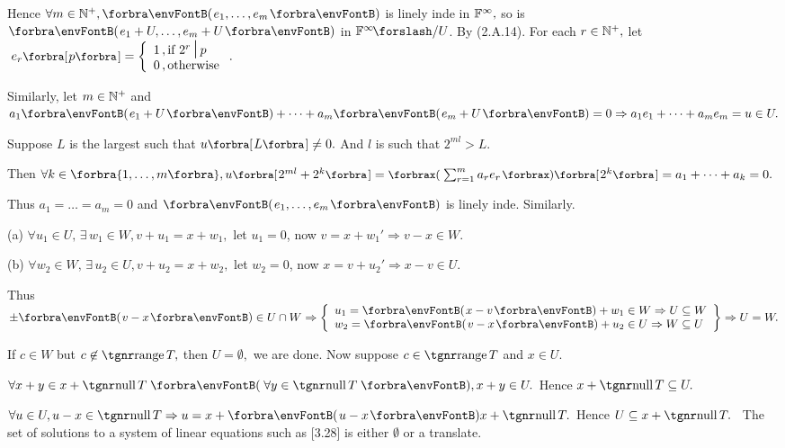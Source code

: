 Hence $\forall m\in\Nbp,\Par{e_1,\dots,e_m}$ is linely inde in ${\mathbb{F}}^{\infty},$ so is $\Par{e_1+U,\dots,e_m+U}$ in $\Fbb^{\infty}\mySlash U$. By (2.A.14).\PfEnd\vspace{14pt}\quad
\Or For each $r\in{\mathbb{N}^+},$ let $\;e_r\Sbra{p}=\hMath[0pt]{l}{\left\{}{\right.}{1\,,\text{if }2^r\,\mmid\,p\\0\,,\text{otherwise}}.$\vspace{4pt}\par\quad
Similarly, let $m\in{\mathbb{N}^+}$ and $a_1\Par{e_1+U}+\dots+a_m\Par{e_m+U}=0\Rightarrow a_1e_1+\dots+a_me_m=u\in U.$\vspace{4pt}\par\quad
Suppose $L$ is the largest such that $u\Sbra{L}\neq 0.$ And $l$ is such that $2^{ml}> L.$\vspace{6pt}\par\quad
Then $\forall k\in\Bra{1,\dots,m},u\Sbra{2^{ml}+2^k}=\XPar{\sum_{r=1}^m a_re_r}\Sbra{2^k}=a_1+\dots+a_k=0.$\vspace{6pt}\par\quad
Thus $a_1=\dots=a_m=0$ and $\Par{e_1,\dots,e_m}$ is linely inde. Similarly.\PfEnd
\SepLine

\par\quad
(a) $\forall u_1\in U,\,\exists\,w_1\in W,v+u_1=x+w_1,$ let $u_1=0$, now $v=x+w_1'\Rightarrow v-x\in W$.\par\quad
(b) $\forall w_2\in W,\,\exists\,u_2\in U,v+u_2=x+w_2,$ let $w_2=0$, now $x=v+u_2'\Rightarrow x-v\in U$.\par\quad
Thus $\pm\Par{v-x}\in U\cap W \Rightarrow\MathLeftrightBrace{l}{u_1=\Par{x-v}+w_1\in W\Rightarrow U\subseteq W\\w_2=\Par{v-x}+u_2\in U\Rightarrow W\subseteq U}\Rightarrow U=W.$\PfEnd
\SepLine

\SepLine

\par\quad
If $c\in W$ but $c\not\in\range T,$ then $U=\emptyset,$ we are done. Now suppose $c\in\range T$ and $x\in U.$\vspace{0pt}\par\quad
$\forall x+y\in x+\null T\;\Par{\,\forall y\in\null T\,},x+y\in U.$ Hence $x+\null T\subseteq U.$\vspace{0pt}\par\quad
$\forall u\in U,u-x\in\null T\Rightarrow u=x+\Par{u-x} x+\null T.$ Hence $U\subseteq x+\null T.$\PfEnd
\Corollary \,\,\,{\tgsl The set of solutions to a system of linear equations such as [3.28] is either $\emptyset$ or a translate.}\par
\SepLine


